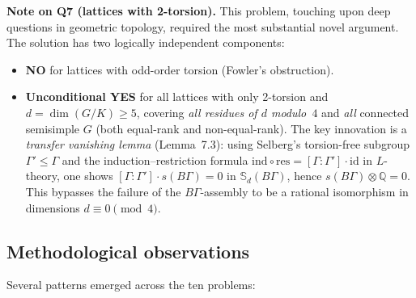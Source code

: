 \medskip
\noindent\textbf{Note on Q7 (lattices with 2-torsion).}
This problem, touching upon deep questions in geometric topology,
required the most substantial novel argument.  The solution has two
logically independent components:
\begin{itemize}[nosep]
\item \textbf{NO} for lattices with odd-order torsion (Fowler's obstruction).
\item \textbf{Unconditional YES} for all lattices with only 2-torsion and
  $d=\dim(G/K)\ge 5$, covering \emph{all residues of $d$ modulo~$4$}
  and \emph{all} connected semisimple $G$ (both equal-rank and non-equal-rank).
  The key innovation is a \emph{transfer vanishing lemma} (Lemma~7.3):
  using Selberg's torsion-free subgroup $\Gamma'\le\Gamma$
  and the induction--restriction formula $\mathrm{ind}\circ\mathrm{res}
  = [\Gamma:\Gamma']\cdot\mathrm{id}$ in $L$-theory,
  one shows $[\Gamma:\Gamma']\cdot s(B\Gamma)=0$ in
  $\mathbb S_d(B\Gamma)$, hence $s(B\Gamma)\otimes\mathbb Q=0$.
  This bypasses the failure of the $B\Gamma$-assembly to be a rational
  isomorphism in dimensions $d\equiv 0\pmod{4}$.
\end{itemize}

\subsection{Methodological observations}

Several patterns emerged across the ten problems:

